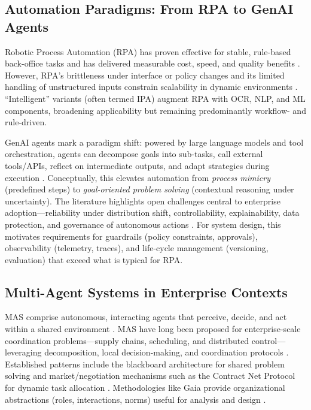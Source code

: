 \subsection{Automation Paradigms: From RPA to GenAI Agents}
Robotic Process Automation (RPA) has proven effective for stable, rule-based back-office tasks and has delivered measurable cost, speed, and quality benefits \parencite{Lacity2016}. However, RPA’s brittleness under interface or policy changes and its limited handling of unstructured inputs constrain scalability in dynamic environments \parencite{Syed2021}. ``Intelligent'' variants (often termed IPA) augment RPA with OCR, NLP, and ML components, broadening applicability but remaining predominantly workflow- and rule-driven.

GenAI agents mark a paradigm shift: powered by large language models and tool orchestration, agents can decompose goals into sub-tasks, call external tools/APIs, reflect on intermediate outputs, and adapt strategies during execution \parencite{Park2023,Rodriguez_Agents_2025}. Conceptually, this elevates automation from \emph{process mimicry} (predefined steps) to \emph{goal-oriented problem solving} (contextual reasoning under uncertainty). The literature highlights open challenges central to enterprise adoption—reliability under distribution shift, controllability, explainability, data protection, and governance of autonomous actions \parencite{Bommasani2022}. For system design, this motivates requirements for guardrails (policy constraints, approvals), observability (telemetry, traces), and life-cycle management (versioning, evaluation) that exceed what is typical for RPA.

\subsection{Multi-Agent Systems in Enterprise Contexts}
MAS comprise autonomous, interacting agents that perceive, decide, and act within a shared environment \parencite{Wooldridge2009}. MAS have long been proposed for enterprise-scale coordination problems—supply chains, scheduling, and distributed control—leveraging decomposition, local decision-making, and coordination protocols \parencite{Parunak1999,JenningsBussmann2003}. Established patterns include the blackboard architecture for shared problem solving \parencite{Nii1986} and market/negotiation mechanisms such as the Contract Net Protocol for dynamic task allocation \parencite{Smith1980}. Methodologies like Gaia provide organizational abstractions (roles, interactions, norms) useful for analysis and design \parencite{Zambonelli2003}.

